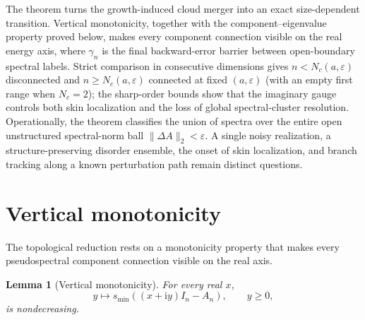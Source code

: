 \documentclass[12pt,anonymous]{iopjournal}
\numberwithin{equation}{section}
\newtheorem{lemma}[lemma]{Lemma}
\theoremstyle{remark}
\newcommand{\ii}{\mathrm i}
\begin{document}
The theorem turns the growth-induced cloud merger into an exact
size-dependent transition.  Vertical monotonicity, together with the
component--eigenvalue property proved below, makes every component
connection visible on the real energy axis, where \(\gamma_n\) is the final
backward-error barrier between open-boundary spectral labels.  Strict
comparison in consecutive dimensions gives
\(n<N_c(a,\varepsilon)\) disconnected and
\(n\geq N_c(a,\varepsilon)\) connected at fixed \((a,\varepsilon)\) (with an
empty first range when \(N_c=2\)); the sharp-order bounds show that the
imaginary gauge controls both skin localization and the loss of global
spectral-cluster resolution.
Operationally, the theorem classifies the union of spectra over the entire
open unstructured spectral-norm ball
\(\lVert\Delta A\rVert_2<\varepsilon\).  A single noisy realization, a
structure-preserving disorder ensemble, the onset of skin localization, and
branch tracking along a known perturbation path remain distinct questions.

\section{Vertical monotonicity}\label{sec:vertical}

The topological reduction rests on a monotonicity property that makes every
pseudospectral component connection visible on the real axis.

\begin{lemma}[Vertical monotonicity]\label{lem:vertical}
For every real \(x\),
\[
 y\longmapsto s_{\min}((x+\ii y)I_n-A_n),\qquad y\geq0,
\]
is nondecreasing.
\end{lemma}
\end{document}
